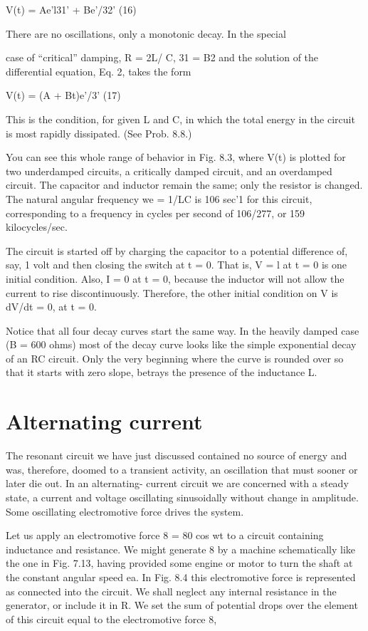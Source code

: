 V(t) = Ae'l31' + Be'/32' (16)

There are no oscillations, only a monotonic decay. In the special

case of ``critical'' damping, R = 2\/L/ C, 31 = B2 and the solution
of the differential equation, Eq. 2, takes the form

V(t) = (A + Bt)e'/3' (17)

This is the condition, for given L and C, in which the total energy
in the circuit is most rapidly dissipated. (See Prob. 8.8.)

You can see this whole range of behavior in Fig. 8.3, where V(t) is
plotted for two underdamped circuits, a critically damped circuit,
and an overdamped circuit. The capacitor and inductor remain the
same; only the resistor is changed. The natural angular frequency
we = 1/\/LC is 106 sec'1 for this circuit, corresponding to a frequency
in cycles per second of 106/277, or 159 kilocycles/sec.

The circuit is started off by charging the capacitor to a potential
difference of, say, 1 volt and then closing the switch at t = 0. That
is, V = l at t = 0 is one initial condition. Also, I = 0 at t = 0, because
the inductor will not allow the current to rise discontinuously.
Therefore, the other initial condition on V is dV/dt = 0, at t = 0.

Notice that all four decay curves start the same way. In the heavily
damped case (B = 600 ohms) most of the decay curve looks like
the simple exponential decay of an RC circuit. Only the very beginning
where the curve is rounded over so that it starts with zero slope,
betrays the presence of the inductance L.

\section{Alternating current}

The resonant circuit we have just discussed contained no source
of energy and was, therefore, doomed to a transient activity, an
oscillation that must sooner or later die out. In an alternating-
current circuit we are concerned with a steady state, a current and
voltage oscillating sinusoidally without change in amplitude. Some
oscillating electromotive force drives the system.

Let us apply an electromotive force 8 = 80 cos wt to a circuit containing
inductance and resistance. We might generate 8 by a
machine schematically like the one in Fig. 7.13, having provided
some engine or motor to turn the shaft at the constant angular
speed ea. In Fig. 8.4 this electromotive force is represented as connected
into the circuit. We shall neglect any internal resistance in
the generator, or include it in R. We set the sum of potential drops
over the element of this circuit equal to the electromotive force 8,

